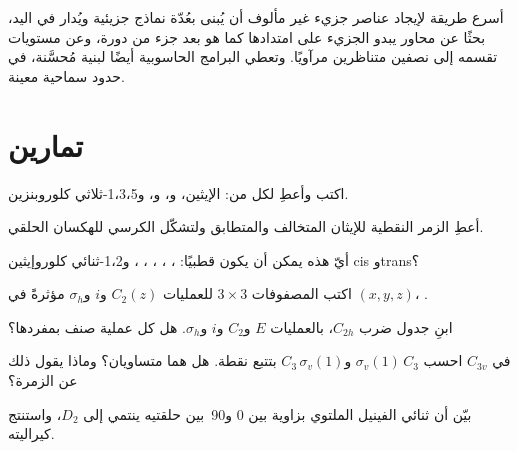 \begin{inthelab}
أسرع طريقة لإيجاد عناصر جزيء غير مألوف أن يُبنى
بعُدّة نماذج جزيئية ويُدار في اليد، بحثًا عن محاور
يبدو الجزيء على امتدادها كما هو بعد جزء من دورة، وعن مستويات
تقسمه إلى نصفين متناظرين مرآويًا. وتعطي البرامج الحاسوبية أيضًا
 لبنية مُحسَّنة، في حدود سماحية معينة.
\end{inthelab}

\section{تمارين}

\begin{exercise}[$\star$]\label{exo:b3:point-groups:1}
اكتب  وأعطِ  لكل من: الإيثين، و،
و، و1،3،5-ثلاثي كلوروبنزين.
\end{exercise}

\begin{exercise}[$\star$]\label{exo:b3:point-groups:2}
أعطِ الزمر النقطية للإيثان المتخالف والمتطابق ولتشكّل الكرسي
للهكسان الحلقي.
\end{exercise}

\begin{exercise}[$\star$]\label{exo:b3:point-groups:3}
أيّ هذه يمكن أن يكون قطبيًا: ، ، ، ، ،
و1،2-ثنائي كلوروإيثين cis وtrans؟
\end{exercise}

\begin{exercise}[$\star$]\label{exo:b3:point-groups:4}
اكتب المصفوفات $3\times3$ للعمليات $C_2(z)$ و$i$ و$\sigma_h$ مؤثرةً في $(x, y, z)$،
.
\end{exercise}

\begin{exercise}[$\star\star$]\label{exo:b3:point-groups:5}
ابنِ جدول ضرب $C_{2h}$، بالعمليات $E$ و$C_2$ و$i$
و$\sigma_h$. هل كل عملية صنف بمفردها؟
\end{exercise}

\begin{exercise}[$\star\star$]\label{exo:b3:point-groups:6}
في $C_{3v}$ احسب $\sigma_v(1)\,C_3$ و$C_3\,\sigma_v(1)$ بتتبع نقطة.
هل هما متساويان؟ وماذا يقول ذلك عن الزمرة؟
\end{exercise}

\begin{exercise}[$\star\star$]\label{exo:b3:point-groups:7}
بيّن أن ثنائي الفينيل الملتوي بزاوية بين 0 و90\textdegree\ بين
حلقتيه ينتمي إلى $D_2$، واستنتج كيراليته.
\end{exercise}


